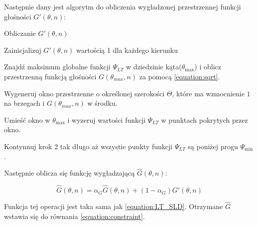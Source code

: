 \noindent Następnie  dany jest algorytm do obliczenia wygładzonej przestrzennej funkcji głośności $G'(\theta,n)$:


\begin{algorithm}
  \label{alg:gprim}
  \caption{Obliczanie $G'(\theta,n)$}
  \begin{algorithmic}[1]
    \State Zainicjalizuj $G'(\theta,n)$ wartością 1 dla każdego kierunku
    
    \State  Znajdź maksimum globalne funkcji $\Psi_{LT}$ w dziedzinie kąta($\theta_{\max}$) i oblicz przestrzenną funkcją głośności $G(\theta_{max},n)$ za pomocą \ref{equation:sqrt}.
    
    \State Wygeneruj okno przestrzenne o określonej szerokości $\Theta$, które ma wzmocnienie $1$ na brzegach i $G(\theta_{max},n)$ w środku.
    
    \State Umieść okno w $\theta_{\max}$ i wyzeruj wartości funkcji $\Psi_{LT}$ w punktach pokrytych przez okno.
    
    \State Kontynnuj krok 2 tak długo aż wszystie punkty funkcji $\Psi_{LT}$ są poniżej progu $\Psi_{\min}$.
  \end{algorithmic}
\end{algorithm}

\noindent Następnie oblicza się funkcję wygładzającą $\widehat{G}(\theta,n)$:

\begin{equation}
    \label{equation:Ghat}
    \widehat{G}(\theta,n)=
    \alpha_{G}\widehat{G}(\theta,n)
    + (1-\alpha_{G})G'(\theta,n)
\end{equation}


\noindent Funkcja tej operacji jest taka sama jak \ref{equation:LT_SLD}. Otrzymane $\widehat{G}$ wstawia się do równania \ref{equation:constraint}.





